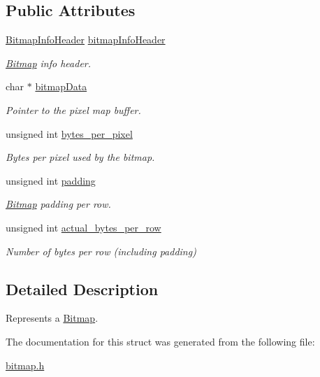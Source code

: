 \subsection*{Public Attributes}
\begin{DoxyCompactItemize}
\item 
\mbox{\hyperlink{struct_bitmap_info_header}{Bitmap\+Info\+Header}} \mbox{\hyperlink{group__bitmap_ga95c481a5ce1ff4af08cd135ca4af120b}{bitmap\+Info\+Header}}
\begin{DoxyCompactList}\small\item\em \mbox{\hyperlink{struct_bitmap}{Bitmap}} info header. \end{DoxyCompactList}\item 
char $\ast$ \mbox{\hyperlink{group__bitmap_gad3fa2b9ac8c411719d9c261f41a999f9}{bitmap\+Data}}
\begin{DoxyCompactList}\small\item\em Pointer to the pixel map buffer. \end{DoxyCompactList}\item 
unsigned int \mbox{\hyperlink{group__bitmap_gac4487f25d79f268d5bb0580e68e82b53}{bytes\+\_\+per\+\_\+pixel}}
\begin{DoxyCompactList}\small\item\em Bytes per pixel used by the bitmap. \end{DoxyCompactList}\item 
unsigned int \mbox{\hyperlink{group__bitmap_ga0ff33a06b37b2b310a499b4ef19fb490}{padding}}
\begin{DoxyCompactList}\small\item\em \mbox{\hyperlink{struct_bitmap}{Bitmap}} padding per row. \end{DoxyCompactList}\item 
unsigned int \mbox{\hyperlink{group__bitmap_ga65e6af125468dec1b3b7cf18fad3800f}{actual\+\_\+bytes\+\_\+per\+\_\+row}}
\begin{DoxyCompactList}\small\item\em Number of bytes per row (including padding) \end{DoxyCompactList}\end{DoxyCompactItemize}


\subsection{Detailed Description}
Represents a \mbox{\hyperlink{struct_bitmap}{Bitmap}}. 

The documentation for this struct was generated from the following file\+:\begin{DoxyCompactItemize}
\item 
\mbox{\hyperlink{bitmap_8h}{bitmap.\+h}}\end{DoxyCompactItemize}
